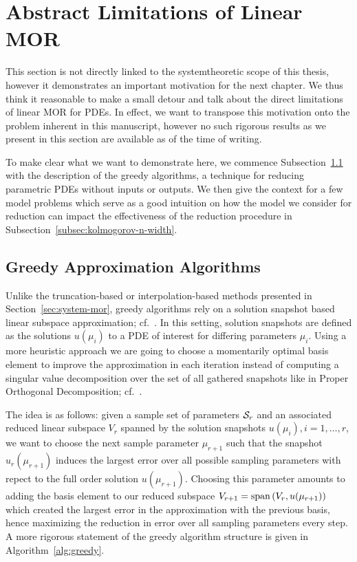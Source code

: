 \section{Abstract Limitations of Linear MOR}\label{sec:limitations-linear-mor}

This section is not directly linked to the systemtheoretic scope of this thesis, however it demonstrates an important motivation for the next chapter.
We thus think it reasonable to make a small detour and talk about the direct limitations of linear MOR for PDEs.
In effect, we want to transpose this motivation onto the problem inherent in this manuscript, however no such rigorous results as we present in this section are available as of the time of writing.

To make clear what we want to demonstrate here, we commence Subsection~\ref{subsec:greedy-algorithms} with the description of the greedy algorithms, a technique for reducing parametric PDEs without inputs or outputs.
We then give the context for a few model problems which serve as a good intuition on how the model we consider for reduction can impact the effectiveness of the reduction procedure in Subsection~\ref{subsec:kolmogorov-n-width}.

\subsection{Greedy Approximation Algorithms}\label{subsec:greedy-algorithms}

Unlike the truncation-based or interpolation-based methods presented in Section~\ref{sec:system-mor}, greedy algorithms rely on a solution snapshot based linear subspace approximation; cf.~\cite{Grepl2005, Rozza2008, Buffa2012}.
In this setting, solution snapshots are defined as the solutions $u(\mu_i)$ to a PDE of interest for differing parameters $\mu_i$.
Using a more heuristic approach we are going to choose a momentarily optimal basis element to improve the approximation in each iteration instead of computing a singular value decomposition over the set of all gathered snapshots like in Proper Orthogonal Decomposition; cf.~\cite{Pinkus1985, Pinnau2008}.

The idea is as follows: given a sample set of parameters $\mathcal{S}_r$ and an associated reduced linear subspace $V_r$ spanned by the solution snapshots $u(\mu_i), i = 1, \dots, r$, we want to choose the next sample parameter $\mu_{r + 1}$ such that the snapshot $u_r(\mu_{r + 1})$ induces the largest error over all possible sampling parameters with repect to the full order solution $u(\mu_{r + 1})$.
Choosing this parameter amounts to adding the basis element to our reduced subspace $V_{r + 1} = \mathop{}\!\mathrm{span}\left(V_r, u(\mu_{r + 1})\right)$ which created the largest error in the approximation with the previous basis, hence maximizing the reduction in error over all sampling parameters every step.
A more rigorous statement of the greedy algorithm structure is given in Algorithm~\ref{alg:greedy}.

